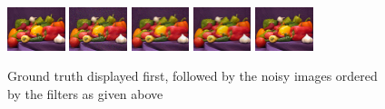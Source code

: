 \documentclass{article}
\begin{document}
\begin{figure}[H]
  \centering
  \includegraphics[width =0.15\textwidth]{../images/peps_truth}
  \includegraphics[width =0.15\textwidth]{../images/peps_noisy1}
  \includegraphics[width =0.15\textwidth]{../images/peps_noisy2}
  \includegraphics[width =0.15\textwidth]{../images/peps_noisy3}
  \includegraphics[width =0.15\textwidth]{../images/peps_noisy4}
  \caption{Ground truth displayed first, followed by the noisy images
    ordered by the filters as given above}
\end{figure}
\end{document}
